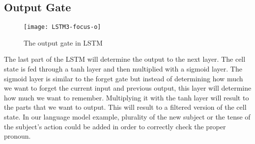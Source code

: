     \subsection{Output Gate}
        \begin{figure}[h]
        \centering
        \texttt{[image: LSTM3-focus-o]}
        \caption{The output gate in LSTM}
        \end{figure}
        The last part of the LSTM will determine the output to the next layer. The cell state is fed through a tanh layer and then multiplied with a sigmoid layer. The sigmoid layer is similar to the forget gate but instead of determining how much we want to forget the current input and previous output, this layer will determine how much we want to remember. Multiplying it with the tanh layer will result to the parts that we want to output. This will result to a filtered version of the cell state. In our language model example, plurality of the new subject or the tense of the subject's action could be added in order to correctly check the proper pronoun.